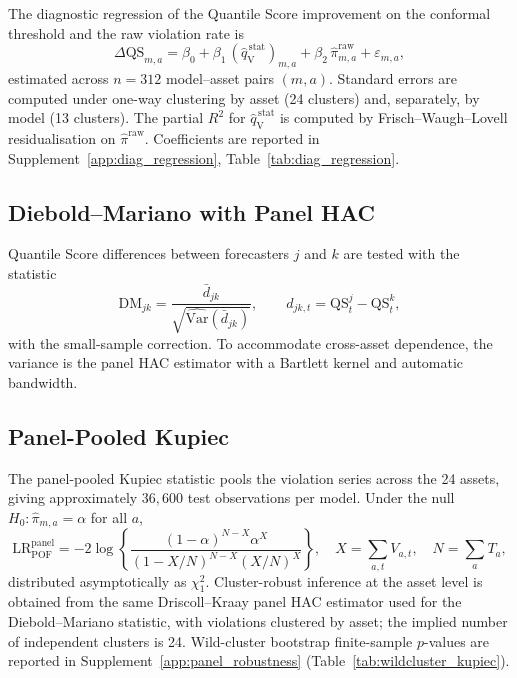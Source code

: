 \documentclass[preprint,11pt,authoryear]{elsarticle}
\newcommand{\1}{\boldsymbol{1}}
\newcommand{\qVstat}{\hat{q}_{\scriptscriptstyle\mathrm{V}}^{\,\mathrm{stat}}}
\begin{document}
The diagnostic regression of the Quantile Score improvement on the
conformal threshold and the raw violation rate is
\begin{equation}
\label{eq:dqs_regression}
\Delta\mathrm{QS}_{m,a}
= \beta_0
+ \beta_1\,(\qVstat)_{m,a}
+ \beta_2\,\hat\pi^{\mathrm{raw}}_{m,a}
+ \varepsilon_{m,a},
\end{equation}
estimated across $n = 312$ model--asset pairs $(m,a)$. Standard errors
are computed under one-way clustering by asset (24 clusters) and,
separately, by model (13 clusters). The partial $R^{2}$ for $\qVstat$
is computed by Frisch--Waugh--Lovell residualisation on
$\hat\pi^{\mathrm{raw}}$. Coefficients are reported in Supplement~\ref{app:diag_regression},
Table~\ref{tab:diag_regression}.

\subsection{Diebold--Mariano with Panel HAC}
\label{app:dm_panel}

Quantile Score differences between forecasters $j$ and $k$ are tested
with the \citet{diebold1995comparing} statistic
\begin{equation}
\label{eq:dm_stat}
\mathrm{DM}_{jk}
= \frac{\bar d_{jk}}
{\sqrt{\widehat{\mathrm{Var}}(\bar d_{jk})}},
\qquad
d_{jk,t} = \mathrm{QS}^{j}_{t}-\mathrm{QS}^{k}_{t},
\end{equation}
with the \citet{harvey1997testing} small-sample correction. To
accommodate cross-asset dependence, the variance is the
\citet{driscoll1998consistent} panel HAC estimator with a Bartlett
kernel and \citet{newey1994automatic} automatic bandwidth.

\subsection{Panel-Pooled Kupiec}
\label{app:panel_kupiec}

The panel-pooled Kupiec statistic pools the violation series across
the 24 assets, giving approximately $36{,}600$ test observations per
model. Under the null $H_0\colon\hat\pi_{m,a}=\alpha$ for all $a$,
\begin{equation}
\label{eq:panel_kupiec}
\mathrm{LR}_{\mathrm{POF}}^{\mathrm{panel}}
=
-2\log\!\left\{
\frac{(1-\alpha)^{N-X}\alpha^{X}}
{(1-X/N)^{N-X}(X/N)^{X}}
\right\},
\quad
X=\sum_{a,t}V_{a,t},
\quad
N=\sum_a T_a,
\end{equation}
distributed asymptotically as $\chi^{2}_1$. Cluster-robust inference
at the asset level is obtained from the same Driscoll--Kraay panel
HAC estimator used for the Diebold--Mariano statistic, with violations
clustered by asset; the implied number of independent clusters is 24.
Wild-cluster bootstrap finite-sample $p$-values are reported in
Supplement~\ref{app:panel_robustness}
(Table~\ref{tab:wildcluster_kupiec}).
\end{document}
